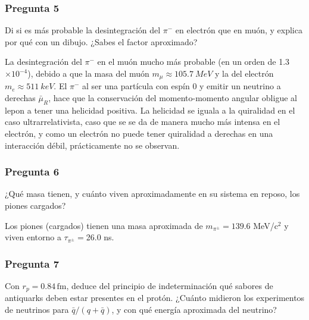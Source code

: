 \vspace*{2em}

\begin{Enunciado}
	\subsubsection*{Pregunta 5}

	Di si es más probable la desintegración del $\pi^-$ en electrón que en muón, y explica por qué con un dibujo. ¿Sabes el factor aproximado?

\end{Enunciado}

La desintegración del $\pi^-$ en el muón mucho más probable (en un orden de 1.3$\times 10^{-4}$), debido a que la masa del muón $m_\mu\approx \SI{105.7}{MeV}$ y la del electrón $m_e\approx \SI{511}{keV}$. El $\pi^-$ al ser una partícula con espín 0 y emitir un neutrino a derechas $\bar{\mu}_R$, hace que la conservación del momento-momento angular  obligue al lepon a tener una helicidad positiva. La helicidad se iguala a la quiralidad en el caso ultrarrelativista, caso que se se da de manera mucho más intensa en el electrón, y como un electrón no puede tener quiralidad a derechas en una interacción débil, prácticamente no se observan. 


\vspace*{2em}

\begin{Enunciado}
	\subsubsection*{Pregunta 6}

	¿Qué masa tienen, y cuánto viven aproximadamente en su sistema en reposo, los piones cargados?

\end{Enunciado}

Los piones (cargados) tienen una masa aproximada de $m_{\pi^{\pm}}=139.6$ MeV/c$^2$ y viven entorno a $\tau_{\pi^{\pm}}=$26.0 ns. 

\vspace*{2em}

\begin{Enunciado}
	\subsubsection*{Pregunta 7}

	Con $r_p = 0.84\,\mathrm{fm}$, deduce del principio de indeterminación qué sabores de antiquarks deben estar presentes en el protón. ¿Cuánto midieron los experimentos de neutrinos para $\bar{q}/(q + \bar{q})$, y con qué energía aproximada del neutrino?

\end{Enunciado}

